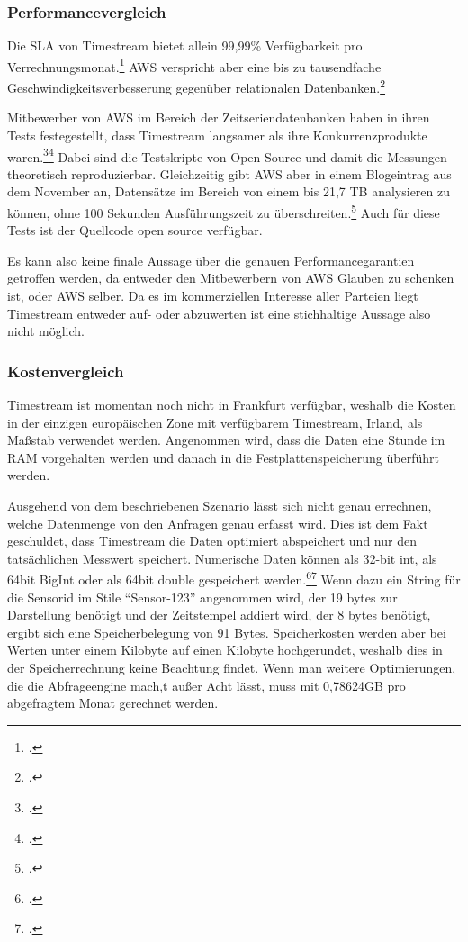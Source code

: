 \subsubsection{Performancevergleich}
Die \ac{SLA} von Timestream bietet allein 99,99\% Verfügbarkeit pro Verrechnungsmonat.\footcite[Vgl.][]{AmazonWebServicesInc..2020d} \ac{AWS} verspricht aber eine bis zu tausendfache Geschwindigkeitsverbesserung gegenüber relationalen Datenbanken.\footcite[Vgl.][]{AmazonWebServicesInc..o.J.ak}

Mitbewerber von \ac{AWS} im Bereich der Zeitseriendatenbanken haben in ihren Tests festegestellt, dass Timestream langsamer als ihre Konkurrenzprodukte waren.\footcite[Vgl.][]{Booz.2020}\nzitat\footcite[Vgl.][]{Crate.ioInc..2020} Dabei sind die Testskripte von \citeauthor{Booz.2020} Open Source und damit die Messungen theoretisch reproduzierbar. Gleichzeitig gibt \ac{AWS} aber in einem Blogeintrag aus dem November an, Datensätze im Bereich von einem bis 21,7 TB analysieren zu können, ohne 100 Sekunden Ausführungszeit zu überschreiten.\footcite[Vgl.][]{Das.2020} Auch für diese Tests ist der Quellcode open source verfügbar.

Es kann also keine finale Aussage über die genauen Performancegarantien getroffen werden, da entweder den Mitbewerbern von \ac{AWS} Glauben zu schenken ist, oder \ac{AWS} selber. Da es im kommerziellen Interesse aller Parteien liegt Timestream entweder auf- oder abzuwerten ist eine stichhaltige Aussage also nicht möglich.

\subsubsection{Kostenvergleich}


Timestream ist momentan noch nicht in Frankfurt verfügbar, weshalb die Kosten in der einzigen europäischen Zone mit verfügbarem Timestream, Irland, als Maßstab verwendet werden. Angenommen wird, dass die Daten eine Stunde im \ac{RAM} vorgehalten werden und danach in die Festplattenspeicherung überführt werden.


Ausgehend von dem beschriebenen Szenario lässt sich nicht genau errechnen, welche Datenmenge von den Anfragen genau erfasst wird. Dies ist dem Fakt geschuldet, dass Timestream die Daten optimiert abspeichert und nur den tatsächlichen Messwert speichert. Numerische Daten können als 32-bit int, als 64bit BigInt oder als 64bit double gespeichert werden.\footcite[Vgl. auch im Folgenden][]{AmazonWebServicesInc..o.J.r}\nzitat\footcite[Vgl. auch im Folgenden][]{AmazonWebServicesInc..o.J.q} Wenn dazu ein String für die Sensorid im Stile \enquote{Sensor-123} angenommen wird, der 19 bytes zur Darstellung benötigt und der Zeitstempel addiert wird, der 8 bytes benötigt, ergibt sich eine Speicherbelegung von 91 Bytes. Speicherkosten werden aber bei Werten unter einem Kilobyte auf einen Kilobyte hochgerundet, weshalb dies in der Speicherrechnung keine Beachtung findet. Wenn man weitere Optimierungen, die die Abfrageengine mach,t außer Acht lässt, muss mit 0,78624GB pro abgefragtem Monat gerechnet werden.

